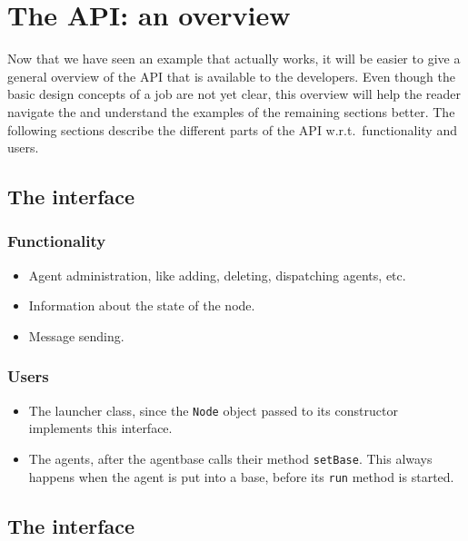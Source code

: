 \documentclass{article}
\begin{document}
\section{The API: an overview}
\label{sec:api}

Now that we have seen an example that actually works, it will be easier
to give a general overview of the API that is available to the developers.
Even though the basic design concepts of a job are not yet clear, this overview will help the reader navigate the 
and understand the examples of the remaining sections better.
The following sections describe the different parts of the API
w.r.t.\ functionality and users.

\subsection{The interface
}
\label{sec:IBase}

\subsubsection{Functionality}

\begin{itemize}
\item Agent administration, like adding, deleting, dispatching agents, etc.
\item Information about the state of the node.
\item Message sending.
\end{itemize}

\subsubsection{Users}

\begin{itemize}
\item The launcher class, since the {\tt Node} object passed to its
constructor implements this interface.
\item The agents, after the agentbase calls their method {\tt setBase}.
This always happens when the agent is put into a base, before its
{\tt run} method is started.
\end{itemize}


\subsection{The interface
}
\label{sec:IDRM}
\end{document}
